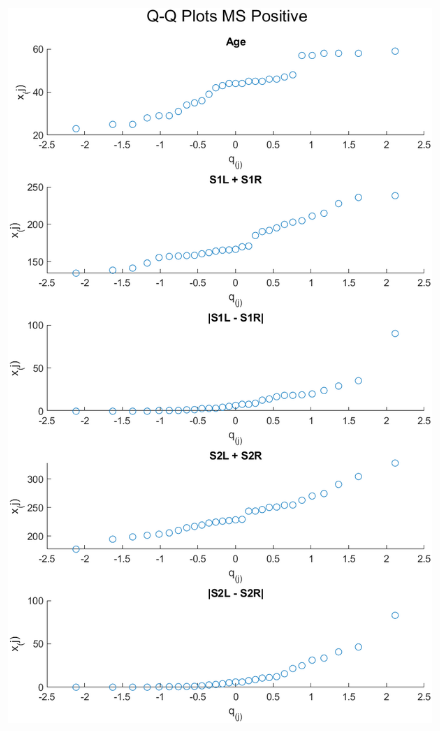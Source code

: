 \begin{center}
    \begin{figure}[H]
        \centering
        \includegraphics[scale=0.6]{./matlab/chapter-4/sol4.31.qq.mspos.png}
    \end{figure}
\end{center}

